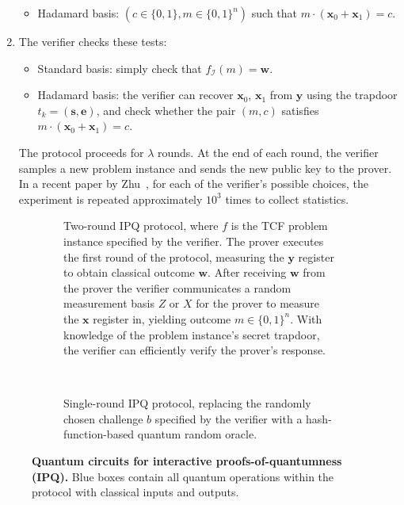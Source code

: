 \documentclass[cryptography,review,submit,pdftex,moreauthors,amsmath,amssymb,aps,strict]{Definitions/mdpi}
\begin{document}
\begin{enumerate}
\begin{itemize}
        \item Hadamard basis: $(c\in\{0,1\},m\in\{0,1\}^n)$ such that $m\cdot(\mathbf{x}_0+\mathbf{x}_1)=c$.
    \end{itemize}
    \item The verifier checks these tests: 
    \begin{itemize}
        \item Standard basis: simply check that $f_{\mathcal{I}}(m)=\mathbf{w}$.
        \item Hadamard basis: the verifier can recover $\mathbf{x}_0$, $\mathbf{x}_1$ from $\mathbf{y}$ using the trapdoor $t_k=(\mathbf{s},\mathbf{e})$, and check whether the pair $(m,c)$ satisfies $m\cdot(\mathbf{x}_0+\mathbf{x}_1)=c$.
    \end{itemize}

The protocol proceeds for $\lambda$ rounds. At the end of each round, the verifier samples a new problem instance and sends the new public key to the prover.
In a recent paper by Zhu~\cite{experiment_interactive_PoQ}, for each of the verifier’s possible choices, the experiment is repeated approximately $10^3$ times to collect statistics. 
\end{enumerate}

\begin{figure}[!htp]
	\centering
	\begin{subfigure}[c]{\linewidth}
			
			\caption{Two-round IPQ protocol, where $f$ is the TCF problem instance specified by the verifier. The prover executes the first round of the protocol, measuring the $\mathbf{y}$ register to obtain classical outcome $\mathbf{w}$. After receiving $\mathbf{w}$ from the prover the verifier communicates a random measurement basis $Z$ or $X$ for the prover to measure the $\mathbf{x}$ register in, yielding outcome $m\in\{0,1\}^n$. With knowledge of the problem instance's secret trapdoor, the verifier can efficiently verify the prover's response.}
	\end{subfigure}\label{fig:ipqlwe}
 \\
	\begin{subfigure}[c]{\linewidth}
		
		\caption{Single-round IPQ protocol, replacing the randomly chosen challenge $b$ specified by the verifier with a hash-function-based quantum random oracle.}
	\end{subfigure}\label{fig:ipqrlwe}
	\caption{\textbf{Quantum circuits for interactive proofs-of-quantumness (IPQ).} Blue boxes contain all quantum operations within the protocol with classical inputs and outputs.} \label{fig:IPQ_circuit.tex}
\end{figure}
\end{document}
